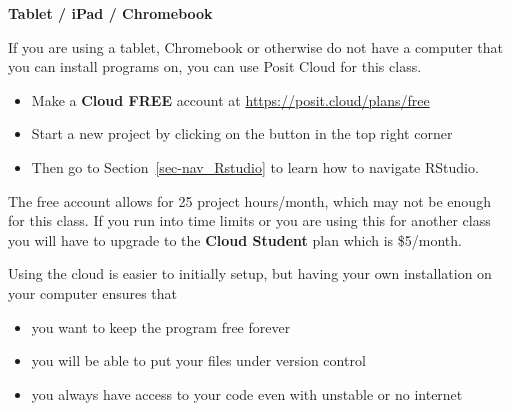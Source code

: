 \documentclass[
  letterpaper,
  DIV=11,
  numbers=noendperiod,
  oneside]{scrreprt}
\providecommand{\tightlist}{%
  \setlength{\itemsep}{0pt}\setlength{\parskip}{0pt}}\usepackage{longtable,booktabs,array}
\begin{document}
\begin{tcolorbox}[enhanced jigsaw, rightrule=.15mm, arc=.35mm, bottomrule=.15mm, leftrule=.75mm, breakable, colframe=quarto-callout-warning-color-frame, left=2mm, toprule=.15mm, opacityback=0, colback=white]

\vspace{-3mm}\textbf{Tablet / iPad / Chromebook}\vspace{3mm}

If you are using a tablet, Chromebook or otherwise do not have a
computer that you can install programs on, you can use Posit Cloud for
this class.

\begin{itemize}
\tightlist
\item
  Make a \textbf{Cloud FREE} account at
  \url{https://posit.cloud/plans/free}
\item
  Start a new project by clicking on the button in the top right corner
\item
  Then go to Section~\ref{sec-nav_Rstudio} to learn how to navigate
  RStudio.
\end{itemize}

The free account allows for 25 project hours/month, which may not be
enough for this class. If you run into time limits or you are using this
for another class you will have to upgrade to the \textbf{Cloud Student}
plan which is \$5/month.

Using the cloud is easier to initially setup, but having your own
installation on your computer ensures that

\begin{itemize}
\tightlist
\item
  you want to keep the program free forever
\item
  you will be able to put your files under version control
\item
  you always have access to your code even with unstable or no internet
\end{itemize}

\end{tcolorbox}
\end{document}
